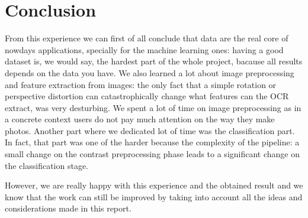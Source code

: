 \documentclass[10pt,twocolumn,letterpaper]{article}
\begin{document}
\section{Conclusion}
\label{sec:conclusion}

From this experience we can first of all conclude that data are the
real core of nowdays applications, specially for the machine learning
ones: having a good dataset is, we would say, the hardest part of the
whole project, bacause all results depends on the data you have. We
also learned a lot about image preprocessing and feature extraction
from images: the only fact that a simple rotation or perspective
distortion can catastrophically change what features can the OCR
extract, was very desturbing. We spent a lot of time on image
preprocessing as in a concrete context users do not pay much attention
on the way they make photos. Another part where we dedicated lot of
time was the classification part. In fact, that part was one of the
harder because the complexity of the pipeline: a small change on the
contrast preprocessing phase leads to a significant change on the
classification stage.

However, we are really happy with this experience and the obtained result and we know that the work can still be improved by taking into account all the ideas and considerations made in this report.

{\small


}
\end{document}
